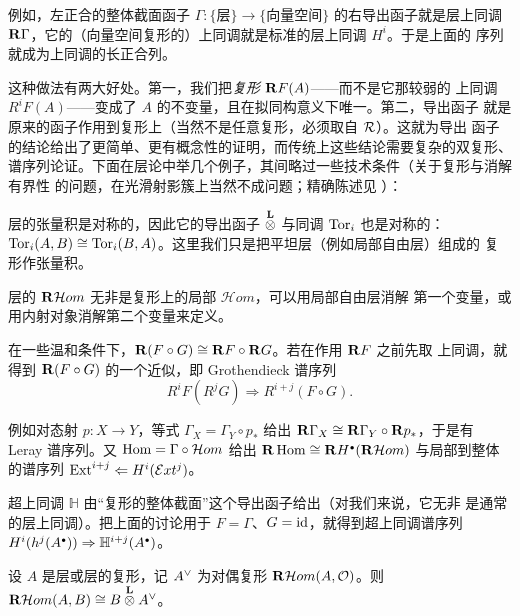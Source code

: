 例如，左正合的整体截面函子
$\Gamma\colon\{\text{层}\}\to\{\text{向量空间}\}$ 的右导出函子就是层上同调
$\mathbf{R}\Gamma$，它的（向量空间复形的）上同调就是标准的层上同调 $H^i$。于是上面的
序列就成为上同调的长正合列。

这种做法有两大好处。第一，我们把\emph{复形} $\mathbf{R} F(A)$——而不是它那较弱的
上同调 $R^iF(A)$——变成了 $A$ 的不变量，且在拟同构意义下唯一。第二，导出函子
就是原来的函子作用到复形上（当然不是任意复形，必须取自 $\mathcal{R}$）。这就为导出
函子的结论给出了更简单、更有概念性的证明，而传统上这些结论需要复杂的双复形、
谱序列论证。下面在层论中举几个例子，其间略过一些技术条件（关于复形与消解有界性
的问题，在光滑射影簇上当然不成问题；精确陈述见 \cite{HRD}）：

\begin{eg}\label{eg:tor}
层的张量积是对称的，因此它的导出函子 $\Ltimes$ 与同调 $\operatorname{Tor}_i$ 也是对称的：
$\operatorname{Tor}_i(A,B)\cong\operatorname{Tor}_i(B,A)$。这里我们只是把平坦层（例如局部自由层）组成的
复形作张量积。
\end{eg}

\begin{eg}\label{eg:rhom}
层的 $\mathbf{R}\mathcal Hom$ 无非是复形上的局部 $\mathcal Hom$，可以用局部自由层消解
第一个变量，或用内射对象消解第二个变量来定义。
\end{eg}

\begin{eg}\label{eg:composition}
在一些温和条件下，$\mathbf{R}(F\circ G)\cong\mathbf{R} F\circ\mathbf{R} G$。若在作用 $\mathbf{R} F$ 之前先取
上同调，就得到 $\mathbf{R}(F\circ G)$ 的一个近似，即 Grothendieck 谱序列
$$
R^iF(R^jG)\Rightarrow R^{i+j}(F\circ G).
$$

例如对态射 $p\colon X\to Y$，等式 $\Gamma_X=\Gamma_Y\circ p_*$ 给出
$\mathbf{R}\Gamma_X\cong\mathbf{R}\Gamma_Y\circ\mathbf{R} p_*$，于是有 Leray 谱序列。又
$\operatorname{Hom}=\Gamma\circ\mathcal Hom$ 给出
$\mathbf{R}\operatorname{Hom}\cong\mathbf{R} H^{\scriptscriptstyle\bullet}(\mathbf{R}\mathcal Hom)$ 与局部到整体的谱序列
$\operatorname{Ext}^{i+j}\Leftarrow H^i(\mathcal Ext^j)$。

超上同调 $\mathbb H$ 由“复形的整体截面”这个导出函子给出（对我们来说，它无非
是通常的层上同调）。把上面的讨论用于 $F=\Gamma$、$G=\operatorname{id}$，就得到超上同调谱序列
$H^i(h^j(A^{\scriptscriptstyle\bullet}))\Rightarrow\mathbb H^{i+j}(A^{\scriptscriptstyle\bullet})$。
\end{eg}

\begin{eg}\label{eg:duality}
设 $A$ 是层或层的复形，记 $A^{\vee}$ 为对偶复形
$\mathbf{R}\mathcal Hom(A,\mathcal{O})$。则 $\R\mathcal Hom(A,B)\cong B\Ltimes A\ve$。
\end{eg}

